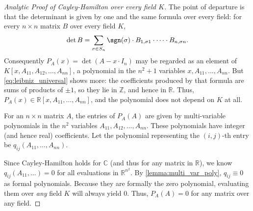 \begin{proof}[Analytic Proof of Cayley-Hamilton over every field $K$]
  The point of departure is that the determinant is given by one and the same formula over every field: for every $n \times n$ matrix $B$ over every field $K$,
  \begin{equation} \label{eq:leibniz_universal}
    \det B = \sum_{\sigma \in S_n} \sgn(\sigma) \cdot B_{1, \sigma 1} \cdot \dots \cdot B_{n, \sigma n}.
  \end{equation}
  Consequently $P_A(x) = \det(A - x \cdot I_n)$ may be regarded as an element of $K[x, A_{11}, A_{12}, \dots, A_{nn}]$, a polynomial in the $n^2 + 1$ variables $x, A_{11}, \dots, A_{nn}$. But \eqref{eq:leibniz_universal} shows more: the coefficients produced by that formula are sums of products of $\pm 1$, so they lie in $\mathbb{Z}$, and hence in $\mathbb{R}$. Thus, $P_A(x) \in \mathbb{R}[x, A_{11}, \dots, A_{nn}]$, and the polynomial does not depend on $K$ at all.

  For an $n \times n$ matrix $A$, the entries of $P_A(A)$ are given by multi-variable polynomials in the $n^2$ variables $A_{11}, A_{12}, \dots, A_{nn}$. These polynomials have integer (and hence real) coefficients. Let the polynomial representing the $(i,j)$-th entry be $q_{ij}(A_{11}, \dots, A_{nn})$.

  Since Cayley-Hamilton holds for $\mathbb{C}$ (and thus for any matrix in $\mathbb{R}$), we know $q_{ij}(A_{11}, \dots) = 0$ for all evaluations in $\mathbb{R}^{n^2}$. By \cref{lemma:multi_var_poly}, $q_{ij} \equiv 0$ as formal polynomials. Because they are formally the zero polynomial, evaluating them over \textit{any} field $K$ will always yield 0. Thus, $P_A(A) = 0$ for any matrix over any field.
\end{proof}

